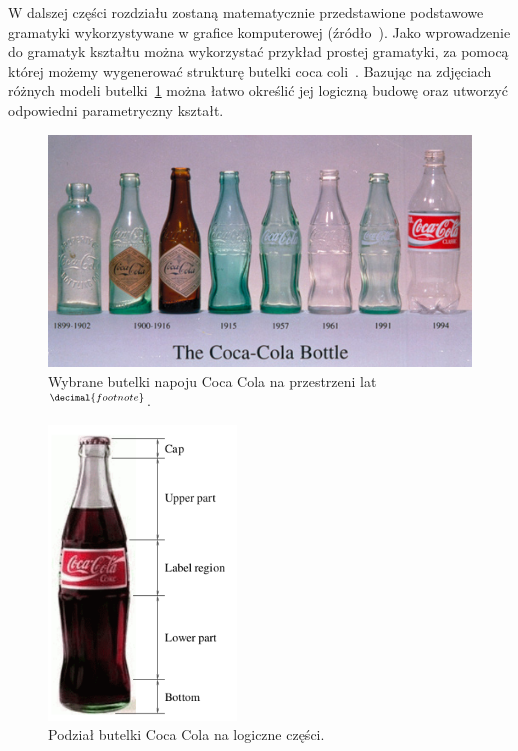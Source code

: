 W dalszej części rozdziału zostaną matematycznie przedstawione podstawowe
gramatyki wykorzystywane w grafice komputerowej (źródło~\cite{gaudi}). Jako
wprowadzenie do gramatyk kształtu można wykorzystać przykład prostej gramatyki, za pomocą
której możemy wygenerować strukturę butelki coca coli~\cite{link10}. Bazując na
zdjęciach różnych modeli butelki~\ref{coca_cola} można łatwo określić jej
logiczną budowę oraz utworzyć odpowiedni parametryczny kształt.

\addtocounter{footnote}{1}
\begin{figure}[h!]
\centering
\includegraphics[width=14cm]{images/Coca-Cola.jpg}
\caption[Wybrane butelki napoju Coca Cola na przestrzeni
lat.]{Wybrane butelki napoju Coca Cola na przestrzeni
lat~$^{\decimal{footnote}}$.}
\label{coca_cola}
\end{figure}

\begin{figure}[h!]
\centering
\includegraphics[width=5cm]{images/coca-cola_parts.png}
\caption{Podział butelki Coca Cola na logiczne części.~\cite{link10}}
\label{coca_cola_parts}
\end{figure}

